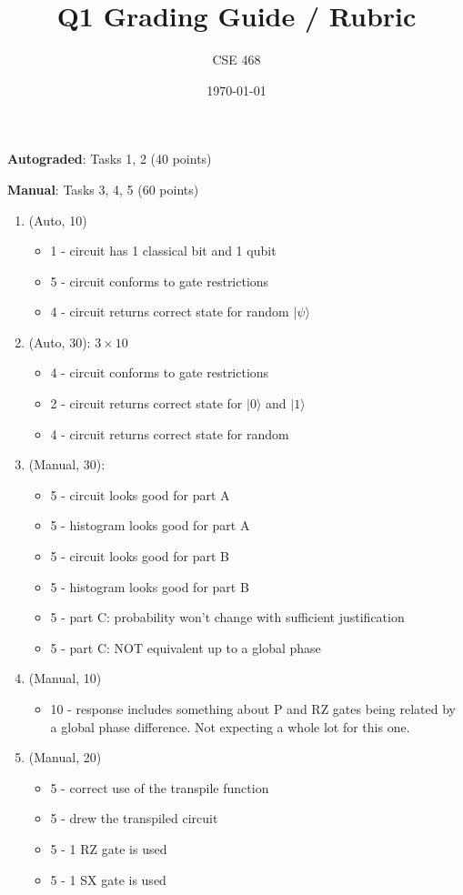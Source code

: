 \documentclass[12pt]{article}
\title{Q1 Grading Guide / Rubric}
\author{CSE 468}
\date{\today}
\begin{document}
\maketitle

\noindent \textbf{Autograded}: Tasks 1, 2 (40 points) 

\noindent \textbf{Manual}: Tasks 3, 4, 5 (60 points)

\begin{enumerate}[font=\bfseries]
    \item (Auto, 10) 
    \begin{itemize}
        \item 1 - circuit has 1 classical bit and 1 qubit
        \item 5 - circuit conforms to gate restrictions
        \item 4 - circuit returns correct state for random $|\psi\rangle$
    \end{itemize}
    \item (Auto, 30): $3\times 10$
    \begin{itemize}
        \item 4 - circuit conforms to gate restrictions
        \item 2 - circuit returns correct state for $|0\rangle$ and $|1\rangle$
        \item 4 - circuit returns correct state for random
    \end{itemize}
    \item (Manual, 30):
    \begin{itemize}
        \item 5 - circuit looks good for part A
        \item 5 - histogram looks good for part A
        \item 5 - circuit looks good for part B
        \item 5 - histogram looks good for part B
        \item 5 - part C: probability won't change with sufficient justification
        \item 5 - part C: NOT equivalent up to a global phase
    \end{itemize}
    \item (Manual, 10)
    \begin{itemize}
        \item 10 - response includes something about P and RZ gates being related by a global phase difference. Not expecting a whole lot for this one.
    \end{itemize}
    \item (Manual, 20)
    \begin{itemize}
        \item 5 - correct use of the transpile function
        \item 5 - drew the transpiled circuit
        \item 5 - 1 RZ gate is used
        \item 5 - 1 SX gate is used
    \end{itemize}
    
    
\end{enumerate}
\end{document}
